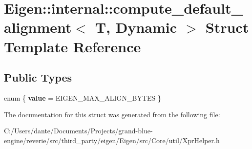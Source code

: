 \hypertarget{struct_eigen_1_1internal_1_1compute__default__alignment_3_01_t_00_01_dynamic_01_4}{}\section{Eigen\+::internal\+::compute\+\_\+default\+\_\+alignment$<$ T, Dynamic $>$ Struct Template Reference}
\label{struct_eigen_1_1internal_1_1compute__default__alignment_3_01_t_00_01_dynamic_01_4}
\subsection*{Public Types}
\begin{DoxyCompactItemize}
\item 
\mbox{\label{struct_eigen_1_1internal_1_1compute__default__alignment_3_01_t_00_01_dynamic_01_4_accddbe94c91491f1be721899c8ec7465}} 
enum \{ {\bfseries value} = E\+I\+G\+E\+N\+\_\+\+M\+A\+X\+\_\+\+A\+L\+I\+G\+N\+\_\+\+B\+Y\+T\+ES
 \}
\end{DoxyCompactItemize}


The documentation for this struct was generated from the following file\+:\begin{DoxyCompactItemize}
\item 
C\+:/\+Users/dante/\+Documents/\+Projects/grand-\/blue-\/engine/reverie/src/third\+\_\+party/eigen/\+Eigen/src/\+Core/util/Xpr\+Helper.\+h\end{DoxyCompactItemize}
